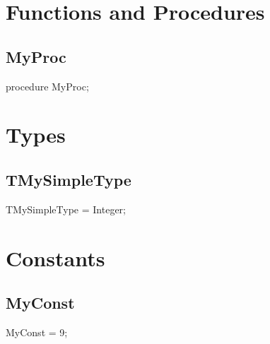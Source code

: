 \documentclass{report}
\begin{document}
\section{Functions and Procedures}
\subsection*{MyProc}
\begin{list}{}{
\setlength{\itemindent}{0cm}
\setlength{\listparindent}{0cm}
\setlength{\leftmargin}{\evensidemargin}
\addtolength{\leftmargin}{\tmplength}
\settowidth{\labelsep}{X}
\addtolength{\leftmargin}{\labelsep}
\setlength{\labelwidth}{\tmplength}
}
\begin{flushleft}
\item[\textbf{Declaration}\hfill]
\begin{ttfamily}
procedure MyProc;\end{ttfamily}


\end{flushleft}
\end{list}
\section{Types}
\subsection*{TMySimpleType}
\begin{list}{}{
\setlength{\itemindent}{0cm}
\setlength{\listparindent}{0cm}
\setlength{\leftmargin}{\evensidemargin}
\addtolength{\leftmargin}{\tmplength}
\settowidth{\labelsep}{X}
\addtolength{\leftmargin}{\labelsep}
\setlength{\labelwidth}{\tmplength}
}
\begin{flushleft}
\item[\textbf{Declaration}\hfill]
\begin{ttfamily}
TMySimpleType = Integer;\end{ttfamily}


\end{flushleft}
\end{list}
\section{Constants}
\subsection*{MyConst}
\begin{list}{}{
\setlength{\itemindent}{0cm}
\setlength{\listparindent}{0cm}
\setlength{\leftmargin}{\evensidemargin}
\addtolength{\leftmargin}{\tmplength}
\settowidth{\labelsep}{X}
\addtolength{\leftmargin}{\labelsep}
\setlength{\labelwidth}{\tmplength}
}
\begin{flushleft}
\item[\textbf{Declaration}\hfill]
\begin{ttfamily}
MyConst = 9;\end{ttfamily}


\end{flushleft}
\end{list}
\end{document}
